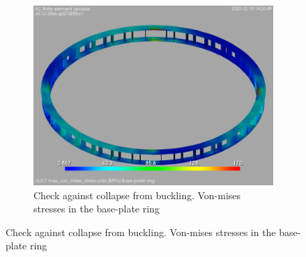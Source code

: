 \documentclass[a4paper,11pt ]{xc_webpage_project}
\begin{document}
\begin{figure}[h]
\begin{subfigure}[b]{0.30\textwidth}
  \includegraphics[width=\textwidth]{figures/vm_baseplate_buckling}
  \caption{Check against collapse from buckling. Von-mises stresses in the base-plate ring}
  \end{subfigure}
  \end{figure}
\end{document}
